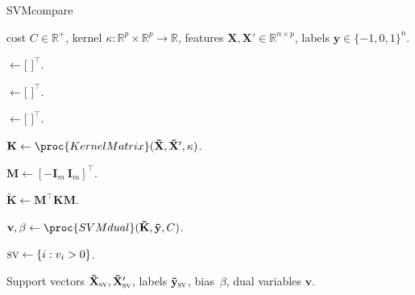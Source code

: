 \documentclass[twoside,11pt]{article}
\newcommand{\sv}{\textsc{sv}}
\newcommand{\RR}{\mathbb R}
\begin{document}
\begin{algorithm}[b!]
   \caption{SVMcompare}
   \label{alg:SVMcompare}
\begin{algorithmic}
   cost $C\in\RR^+$, kernel
  $\kappa:\RR^p\times \RR^p \rightarrow \RR$, features $\mathbf
  X,\mathbf X'\in\RR^{n \times p}$, labels $\mathbf y\in\{-1,0,1\}^n$.

  \STATE {} $\gets [$
  $]^\intercal$.

  \STATE {} $\gets [$
  $]^\intercal$.

  \STATE {} $\gets [$
  $]^\intercal$.

  \STATE $\mathbf K \gets \proc{KernelMatrix}(
  \mathbf{\tilde X}, \mathbf{\tilde X'}, \kappa)$.

  \STATE $\mathbf M \gets [ -\mathbf I_m\ \mathbf I_m ]^\intercal$.

  \STATE $\mathbf{\tilde K} \gets \mathbf M^\intercal \mathbf  K \mathbf M$.

  \STATE $\mathbf v,\beta \gets \proc{SVMdual}(
  \mathbf{\tilde K}, \mathbf{\tilde y}, C)$.

  \STATE $\sv \gets\{i: v_i>0\}$.
  
   Support vectors $\mathbf{\tilde
    X}_{\sv },\mathbf{\tilde X}_{\sv }'$, labels
  $\mathbf{\tilde y}_{\sv }$, bias~$\beta$, dual variables $\mathbf v$.

   \end{algorithmic}
\end{algorithm}
\end{document}
